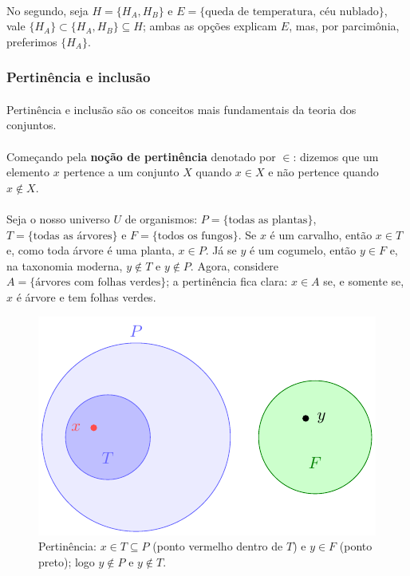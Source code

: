 \documentclass[12pt,a4paper]{article}
\begin{document}
\paragraph{}
No segundo, seja \(H=\{H_A, H_B\}\) e \(E=\{\text{queda de temperatura},\, \text{céu nublado}\}\), vale \(\{H_A\} \subset \{H_A,H_B\} \subseteq H\); ambas as opções explicam \(E\), mas,
por parcimônia, preferimos \(\{H_A\}\).

\subsubsection{Pertinência e inclusão}
\paragraph{}

Pertinência e inclusão são os conceitos mais fundamentais da teoria dos conjuntos.

\paragraph{}
Começando pela \textbf{noção de pertinência} denotado por \(\in\): dizemos que um elemento \(x\) pertence a um conjunto \(X\) quando \(x \in X\) e não pertence quando \(x \notin X\).

\paragraph{}
Seja o nosso universo \(U\) de organismos: \(P=\{\text{todas as plantas}\}\), \(T=\{\text{todas as árvores}\}\) e \(F=\{\text{todos os fungos}\}\). Se \(x\) é um carvalho, então \(x\in T\) e, como toda árvore é uma planta, \(x\in P\). Já se \(y\) é um cogumelo, então \(y\in F\) e, na taxonomia moderna, \(y\notin T\) e \(y\notin P\). Agora, considere \(A=\{\text{árvores com folhas verdes}\}\); a pertinência fica clara: \(x\in A\) se, e somente se, \(x\) é árvore e tem folhas verdes.


\begin{figure}[H]
    \centering
    \includegraphics[width=0.9\linewidth]{figures/fig_pertinencia.pdf}

    \caption{Pertinência: $x\in T\subseteq P$ (ponto vermelho dentro de $T$) e $y\in F$ (ponto preto); logo $y\notin P$ e $y\notin T$.}
    \label{fig:pertinencia}\end{figure}
\end{document}

